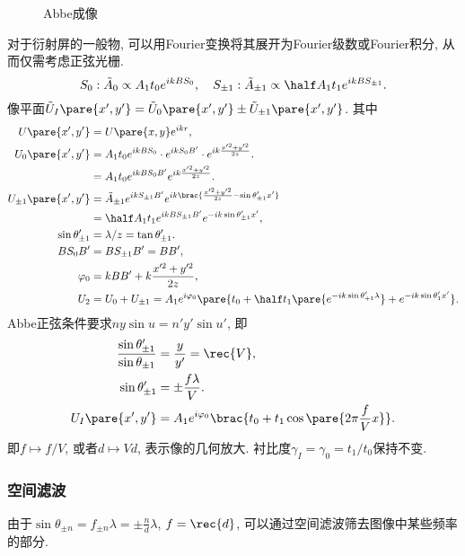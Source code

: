 \documentclass{ctexart}
\begin{document}
\begin{figure}[ht]
    \centering
    \caption{Abbe成像}
\end{figure}
对于衍射屏的一般物, 可以用Fourier变换将其展开为Fourier级数或Fourier积分, 从而仅需考虑正弦光栅.
\[ S_0: \tilde{A}_0 \propto A_1 t_0 e^{ikBS_0},\quad S_{\pm 1}: \tilde{A}_{\pm 1} \propto \half A_1 t_1 e^{ikBS_{\pm 1}}. \]
像平面$\tilde{U}_I\pare{x',y'} = \tilde{U}_0 \pare{x',y'}  \pm \tilde{U}_{\pm 1}\pare{x',y'}$. 其中
\begin{align*}
    U\pare{x',y'} &= U\pare{x,y} e^{ikr}, \\
    U_0\pare{x',y'} &= A_1 t_0 e^{ikBS_0}\cdot e^{ikS_0 B'}\cdot e^{ik \frac{x'^2 + y'^2}{2z}}. \\
    &= A_1 t_0 e^{ikBS_0 B'} e^{ik \frac{x'^2+y'^2}{2z}}. \\
    U_{\pm 1}\pare{x',y'} &= \tilde{A}_{\pm 1} e^{ikS_{\pm 1}B'} e^{ik\brac{\frac{x'^2+y'^2}{2z} - \sin\theta'_{\pm 1}x'}} \\
    &= \half A_1 t_1 e^{ikBS_{\pm 1}B'} e^{-ik\sin\theta'_{\pm 1} x'}, \\
    \sin\theta'_{\pm 1} &= \lambda / z = \tan \theta'_{\pm 1}. \\
    BS_0 B' &= BS_{\pm 1}B' = BB', \\
    \varphi_0 &= kBB' + k \frac{x'^2+y'^2}{2z}, \\
    U_2 &= U_0 + U_{\pm 1} = A_1 e^{i\varphi_0} \pare{t_0 + \half t_1 \pare{e^{-ik\sin\theta'_{+1}\lambda}} + e^{-ik\sin\theta'_1 x'}}.
\end{align*}
Abbe正弦条件要求$ny\sin u = n'y'\sin u'$, 即
\begin{align*}
    \frac{\sin \theta'_{\pm 1}}{\sin\theta_{\pm 1}} &= \frac{y}{y'} = \rec{V}, \\
    \sin \theta'_{\pm 1} &= \pm \frac{f\lambda}{V}. \\
    U_I\pare{x',y'} &= A_1 e^{i\varphi_0} \brac{t_0 + t_1 \cos\pare{2\pi \frac{f}{V}x}}.
\end{align*}
即$f\mapsto f/V$, 或者$d\mapsto Vd$, 表示像的几何放大. 衬比度$\gamma_I = \gamma_0 = t_1/t_0$保持不变.


\subsubsection{空间滤波} %
\label{ssub:空间滤波}

由于$\sin \theta_{\pm n} = f_{\pm n} \lambda = \displaystyle \pm \frac{n}{d}\lambda$, $\displaystyle f = \rec{d}$, 可以通过空间滤波筛去图像中某些频率的部分.
\end{document}
